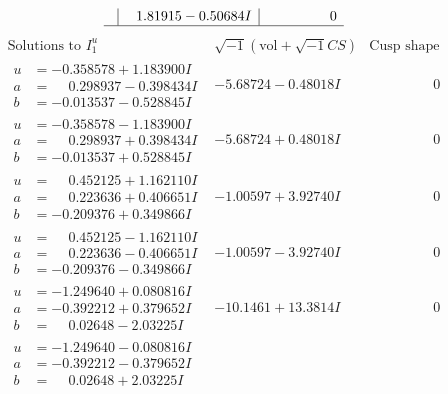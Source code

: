 \documentclass[1p]{elsarticle_modified}
\theoremstyle{definition}
\newcommand{\I}{\sqrt{-1}}
\begin{document}
$$\begin{array}{c|c|c}
 & \phantom{-}1.81915 - 0.50684 I & \phantom{-0.000000 } 0\\
 \hline 
 \end{array}$$\newpage$$\begin{array}{c|c|c}  
\text{Solutions to }I^u_{1}& \I (\text{vol} + \sqrt{-1}CS) & \text{Cusp shape}\\
 \hline 
\begin{aligned}
u &= -0.358578 + 1.183900 I \\
a &= \phantom{-}0.298937 - 0.398434 I \\
b &= -0.013537 - 0.528845 I\end{aligned}
 & -5.68724 - 0.48018 I & \phantom{-0.000000 } 0 \\ \hline\begin{aligned}
u &= -0.358578 - 1.183900 I \\
a &= \phantom{-}0.298937 + 0.398434 I \\
b &= -0.013537 + 0.528845 I\end{aligned}
 & -5.68724 + 0.48018 I & \phantom{-0.000000 } 0 \\ \hline\begin{aligned}
u &= \phantom{-}0.452125 + 1.162110 I \\
a &= \phantom{-}0.223636 + 0.406651 I \\
b &= -0.209376 + 0.349866 I\end{aligned}
 & -1.00597 + 3.92740 I & \phantom{-0.000000 } 0 \\ \hline\begin{aligned}
u &= \phantom{-}0.452125 - 1.162110 I \\
a &= \phantom{-}0.223636 - 0.406651 I \\
b &= -0.209376 - 0.349866 I\end{aligned}
 & -1.00597 - 3.92740 I & \phantom{-0.000000 } 0 \\ \hline\begin{aligned}
u &= -1.249640 + 0.080816 I \\
a &= -0.392212 + 0.379652 I \\
b &= \phantom{-}0.02648 - 2.03225 I\end{aligned}
 & -10.1461 + 13.3814 I & \phantom{-0.000000 } 0 \\ \hline\begin{aligned}
u &= -1.249640 - 0.080816 I \\
a &= -0.392212 - 0.379652 I \\
b &= \phantom{-}0.02648 + 2.03225 I\end{aligned}

\end{array}$$
\end{document}
